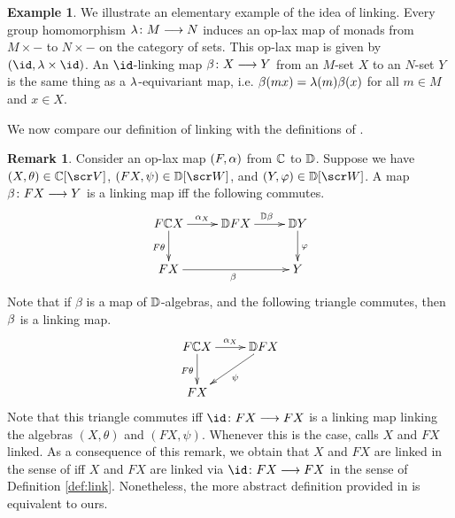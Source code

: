 \documentclass{amsart}
\theoremstyle{definition}
\newtheorem{exmp}[thm]{Example}
\newtheorem{rem}[thm]{Remark}
\begin{document}
\begin{exmp}
    We illustrate an elementary example of the idea of linking. Every group homomorphism $\lambda \colon M \longrightarrow N$ induces an op-lax map of monads from $M \times -$ to $N \times -$ on the category of sets. 
    This op-lax map is given by $(\id,\la \times \id)$. An $\id$-linking map $\beta \colon X \longrightarrow Y$ from an $M$-set $X$ to an $N$-set $Y$ is the same thing as a $\lambda$-equivariant map, i.e. $\beta(mx) = \lambda(m)\beta(x)$ for all $m \in M$ and $x \in X$.
\end{exmp}
We now compare our definition of linking with the definitions of \cite{KMZ25}.
\begin{rem}\label{rem:KMZ25}
    Consider an op-lax map $(F,\alpha)$ from $\mathbb{C}$ to $\mathbb{D}$. Suppose we have $(X,\theta) \in \bC[\sV]$, $(FX,\psi) \in \bD[\sW]$, and $(Y,\phz) \in \bD[\sW]$. A map $\beta \colon FX \longrightarrow Y$ is a linking map iff the
    following commutes.
    \[
    \xymatrix{
        F \bC X \ar[d]_{F\theta} \ar[r]^{\al_X} & \bD FX \ar[r]^{\bD \be} & \bD Y \ar[d]^{\phz} \\
        FX \ar[rr]_{\be} && Y
    }
    \]
    Note that if $\beta$ is a map of $\mathbb{D}$-algebras, and the following triangle commutes, then $\beta$ is a linking map.
    \[
    \xymatrix{
        F \bC X \ar[r]^{\al_X} \ar[d]_{F\theta} & \bD F X \ar[dl]^{\psi} \\
        FX
    }
    \]
    \noindent Note that this triangle commutes iff $\id \colon FX \rtarr FX$ is a linking map linking the algebras $(X,\theta)$ and $(FX,\psi)$. Whenever this is the case, \cite[Definition 2.31]{KMZ25} calls $X$ and $FX$ linked. As a consequence of this remark, we obtain that $X$ and $FX$ are linked in the sense of \cite{KMZ25} iff
    $X$ and $FX$ are linked via $\id \colon FX \rtarr FX$ in the sense of Definition \ref{def:link}. Nonetheless, the more abstract definition provided in \cite[Definition 4.2]{KMZ25} is equivalent to ours. 
\end{rem}
\end{document}

